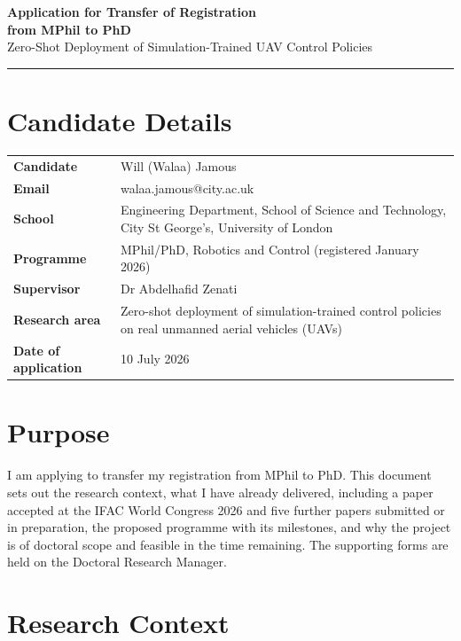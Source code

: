 \documentclass[11pt,a4paper]{article}
\begin{document}
\begin{center}
  {\LARGE\bfseries\color{cityblue} Application for Transfer of Registration\\[2pt] from MPhil to PhD}\\[8pt]
  {\large\color{gray} Zero-Shot Deployment of Simulation-Trained UAV Control Policies}\\[6pt]
  \rule{\textwidth}{0.8pt}
\end{center}

\section{Candidate Details}

\begin{tabularx}{\textwidth}{@{}>{\bfseries}p{4.2cm}X@{}}
  \toprule
  Candidate & Will (Walaa) Jamous \\
  Email & walaa.jamous@city.ac.uk \\
  School & Engineering Department, School of Science and Technology, City St George's, University of London \\
  Programme & MPhil/PhD, Robotics and Control (registered January 2026) \\
  Supervisor & Dr Abdelhafid Zenati \\
  Research area & Zero-shot deployment of simulation-trained control policies on real unmanned aerial vehicles (UAVs) \\
  Date of application & 10 July 2026 \\
  \bottomrule
\end{tabularx}

\section{Purpose}

I am applying to transfer my registration from MPhil to PhD. This document sets out the research context, what I have already delivered, including a paper accepted at the IFAC World Congress 2026 and five further papers submitted or in preparation, the proposed programme with its milestones, and why the project is of doctoral scope and feasible in the time remaining. The supporting forms are held on the Doctoral Research Manager.

\section{Research Context}
\end{document}
